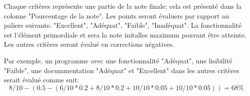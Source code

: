 Chaque critères représente une partie de la note finale; cela est présenté dans la colonne "Pourcentage de la note". Les points seront évaluers par rapport au paliers suivants: "Excellent", "Adéquat", "Faible", "Inadéquat". La fonctionnalité est l'élément primordiale et sera la note initalles maximum pouvant être atteinte. Les autres critères seront évalué en corrections négatives.

Par exemple, un programme avec une fonctionnalité "Adéquat", une lisibilité "Faible", une docummentation "Adéquat" et "Excellent" dans les autres critères serait évalué comme suit:
$$8/10 - (0.5 - (6/10 * 0.2 + 8/10 * 0.2 + 10/10 * 0.05 + 10/10 * 0.05)) = 68\%$$